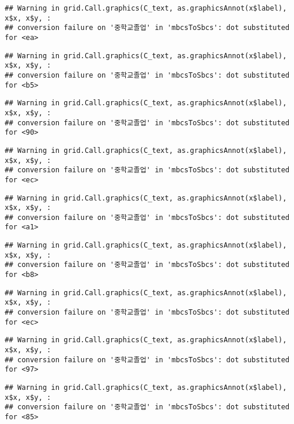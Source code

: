 \documentclass[
]{article}
\begin{document}
\begin{verbatim}
## Warning in grid.Call.graphics(C_text, as.graphicsAnnot(x$label), x$x, x$y, :
## conversion failure on '중학교졸업' in 'mbcsToSbcs': dot substituted for <ea>
\end{verbatim}

\begin{verbatim}
## Warning in grid.Call.graphics(C_text, as.graphicsAnnot(x$label), x$x, x$y, :
## conversion failure on '중학교졸업' in 'mbcsToSbcs': dot substituted for <b5>
\end{verbatim}

\begin{verbatim}
## Warning in grid.Call.graphics(C_text, as.graphicsAnnot(x$label), x$x, x$y, :
## conversion failure on '중학교졸업' in 'mbcsToSbcs': dot substituted for <90>
\end{verbatim}

\begin{verbatim}
## Warning in grid.Call.graphics(C_text, as.graphicsAnnot(x$label), x$x, x$y, :
## conversion failure on '중학교졸업' in 'mbcsToSbcs': dot substituted for <ec>
\end{verbatim}

\begin{verbatim}
## Warning in grid.Call.graphics(C_text, as.graphicsAnnot(x$label), x$x, x$y, :
## conversion failure on '중학교졸업' in 'mbcsToSbcs': dot substituted for <a1>
\end{verbatim}

\begin{verbatim}
## Warning in grid.Call.graphics(C_text, as.graphicsAnnot(x$label), x$x, x$y, :
## conversion failure on '중학교졸업' in 'mbcsToSbcs': dot substituted for <b8>
\end{verbatim}

\begin{verbatim}
## Warning in grid.Call.graphics(C_text, as.graphicsAnnot(x$label), x$x, x$y, :
## conversion failure on '중학교졸업' in 'mbcsToSbcs': dot substituted for <ec>
\end{verbatim}

\begin{verbatim}
## Warning in grid.Call.graphics(C_text, as.graphicsAnnot(x$label), x$x, x$y, :
## conversion failure on '중학교졸업' in 'mbcsToSbcs': dot substituted for <97>
\end{verbatim}

\begin{verbatim}
## Warning in grid.Call.graphics(C_text, as.graphicsAnnot(x$label), x$x, x$y, :
## conversion failure on '중학교졸업' in 'mbcsToSbcs': dot substituted for <85>
\end{verbatim}
\end{document}
